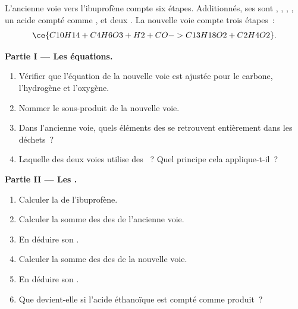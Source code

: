 \begin{problem}
\label{pb:g12:synthesis-strategy:1}
L'ancienne voie vers l'ibuprofène  compte six étapes.
Additionnés, ses  sont , ,
, , un acide compté comme ,
 et deux . La nouvelle voie compte trois étapes~:
\[
  \ce{C10H14 + C4H6O3 + H2 + CO -> C13H18O2 + C2H4O2} .
\]

\medskip
\noindent\textbf{Partie I --- Les équations.}
\begin{enumerate}
  \item Vérifier que l'équation de la nouvelle voie est ajustée pour le
        carbone, l'hydrogène et l'oxygène.
  \item Nommer le sous-produit de la nouvelle voie.
  \item Dans l'ancienne voie, quels éléments des  se retrouvent
        entièrement dans les déchets~?
  \item Laquelle des deux voies utilise des ~? Quel principe
        cela applique-t-il~?
\end{enumerate}

\medskip
\noindent\textbf{Partie II --- Les .}
\begin{enumerate}[resume]
  \item Calculer la  de l'ibuprofène.
  \item Calculer la somme des  des  de l'ancienne
        voie.
  \item En déduire son .
  \item Calculer la somme des  des  de la
        nouvelle voie.
  \item En déduire son .
  \item Que devient-elle si l'acide éthanoïque est compté comme
        produit~?
\end{enumerate}


\end{problem}
